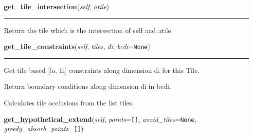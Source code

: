     \label{Tiling:Tile:get_tile_intersection}

    \vspace{0.5ex}

\hspace{.8\funcindent}\begin{boxedminipage}{\funcwidth}

    \raggedright \textbf{get\_tile\_intersection}(\textit{self}, \textit{atile})

    \vspace{-1.5ex}

    \rule{\textwidth}{0.5\fboxrule}
\setlength{\parskip}{2ex}
    Return the tile which is the intersection of self and atile.

\setlength{\parskip}{1ex}
    \end{boxedminipage}

    \label{Tiling:Tile:get_tile_constraints}

    \vspace{0.5ex}

\hspace{.8\funcindent}\begin{boxedminipage}{\funcwidth}

    \raggedright \textbf{get\_tile\_constraints}(\textit{self}, \textit{tiles}, \textit{di}, \textit{bcdi}={\tt None})

    \vspace{-1.5ex}

    \rule{\textwidth}{0.5\fboxrule}
\setlength{\parskip}{2ex}
    Get tile based [lo, hi] constraints along dimension di for this Tile.

    Return boundary conditions along dimension di in bcdi.

    Calculates tile occlusions from the list tiles.

\setlength{\parskip}{1ex}
    \end{boxedminipage}

    \label{Tiling:Tile:get_hypothetical_extend}

    \vspace{0.5ex}

\hspace{.8\funcindent}\begin{boxedminipage}{\funcwidth}

    \raggedright \textbf{get\_hypothetical\_extend}(\textit{self}, \textit{points}={\tt []}, \textit{avoid\_tiles}={\tt None}, \textit{greedy\_absorb\_points}={\tt []})

\setlength{\parskip}{2ex}
\setlength{\parskip}{1ex}
    \end{boxedminipage}

